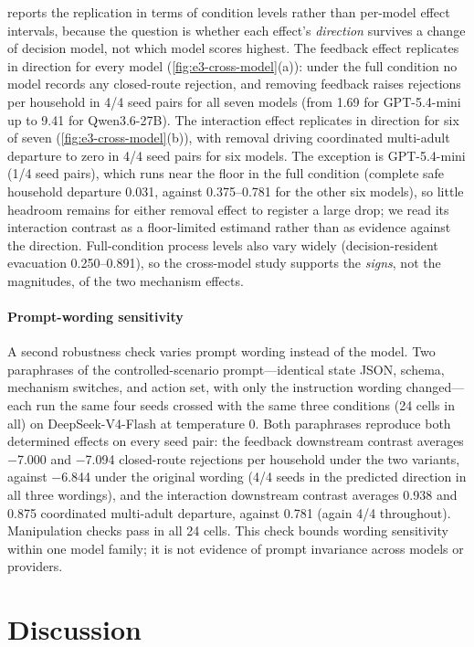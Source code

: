 \documentclass[journal]{IEEEtran}
\begin{document}
 reports the replication in terms of condition levels
rather than per-model effect intervals, because the question is whether each
effect's \emph{direction} survives a change of decision model, not which model
scores highest. The feedback effect replicates in direction for every model
(\cref{fig:e3-cross-model}(a)): under the full condition no model records any
closed-route rejection, and removing feedback raises rejections per household
in 4/4 seed pairs for all seven models (from 1.69 for GPT-5.4-mini up to 9.41
for Qwen3.6-27B). The interaction effect replicates in direction for six of
seven (\cref{fig:e3-cross-model}(b)), with removal driving coordinated multi-adult departure
to zero in 4/4 seed pairs for six models. The exception is GPT-5.4-mini (1/4
seed pairs), which runs near the floor in the full condition (complete safe
household departure 0.031, against 0.375--0.781 for the other six models), so
little headroom remains for either removal effect to register a large drop; we
read its interaction contrast as a floor-limited estimand rather than as
evidence against the direction. Full-condition process levels also vary widely
(decision-resident evacuation 0.250--0.891), so the cross-model study supports
the \emph{signs}, not the magnitudes, of the two mechanism effects.

\paragraph{Prompt-wording sensitivity}
A second robustness check varies prompt wording instead of the model. Two
paraphrases of the controlled-scenario prompt---identical state JSON,
schema, mechanism switches, and action set, with only the instruction wording
changed---each run the same four seeds crossed with the same three conditions
(24 cells in all) on DeepSeek-V4-Flash at
temperature 0. Both paraphrases reproduce both determined effects on every
seed pair: the feedback downstream contrast averages $-$7.000 and $-$7.094
closed-route rejections per household under the two variants, against $-$6.844
under the original wording (4/4 seeds in the predicted direction in all three
wordings), and the interaction downstream contrast averages 0.938 and 0.875
coordinated multi-adult departure, against 0.781 (again 4/4 throughout). Manipulation
checks pass in all 24 cells. This check
bounds wording sensitivity within one model family; it
is not evidence of prompt invariance across models or providers.

\section{Discussion}
\label{sec:discussion}
\end{document}
